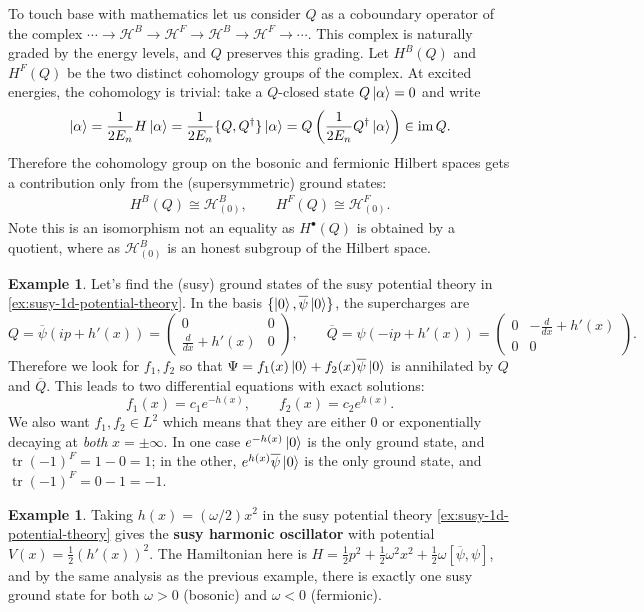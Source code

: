 \documentclass{report}
\theoremstyle{plain}
\theoremstyle{definition}
\newtheorem{example}[theorem]{Example}
\theoremstyle{remark}
\DeclareMathOperator{\im}{im}
\DeclareMathOperator{\tr}{tr}
\newcommand{\mc}{\mathcal}
\newcommand{\cnj}{\overline}
\newcommand{\FR}[2]{\frac{#1}{#2}}
\begin{document}
To touch base with mathematics let us consider $Q$ as a coboundary
operator of the complex $\cdots \to \mc H^B\to \mc H^F \to \mc H^B \to
\mc H^F \to \cdots$. This complex is naturally graded by the energy
levels, and $Q$ preserves this grading. Let $H^B(Q)$ and $H^F(Q)$ be
the two distinct cohomology groups of the complex. At excited
energies, the cohomology is trivial: take a $Q$-closed state
$Q\ket{\alpha}=0$ and write
\[ \ket\alpha = \FR{1}{2E_n}H \ket\alpha = \FR{1}{2E_n}\{Q,Q^\dagger\}\ket\alpha = Q \left( \FR{1}{2E_n} Q^\dagger\ket\alpha \right) \in \im Q. \]
Therefore the cohomology group on the bosonic and fermionic Hilbert
spaces gets a contribution only from the (supersymmetric) ground
states:
\begin{align} H^B(Q) \cong \mc H^B_{(0)},\qquad H^F(Q) \cong \mc H^F_{(0)}.
\label{groundStateCohom}
\end{align}
Note this is an isomorphism not an equality as $H^\bullet(Q)$ is obtained
by a quotient, where as $\mc H^B_{(0)}$ is an honest subgroup of the
Hilbert space.

\begin{example} \label{ex:susy-1d-potential-theory-ground-states}
  Let's find the (susy) ground states of the susy potential theory in
  \ref{ex:susy-1d-potential-theory}. In the basis $\{\ket 0,
  \cnj\psi\ket0\}$, the supercharges are
  \[ Q=\cnj\psi(ip+h'(x))=\begin{pmatrix}0&0\\\FR{d}{dx}+h'(x)&0\end{pmatrix},\qquad \cnj Q=\psi(-ip+h'(x))=\begin{pmatrix}0&-\FR{d}{dx}+h'(x)\\0&0\end{pmatrix}.\]
  Therefore we look for $f_1,f_2$ so that $\Psi= f_1(x) \ket0 + f_2(x)
  \cnj\psi\ket0$ is annihilated by $Q$ and $\cnj Q$. This leads to two
  differential equations with exact
  solutions:
  \[f_1(x)=c_1e^{-h(x)},\qquad f_2(x)=c_2 e^{h(x)}.\]
  We also want $f_1,f_2 \in L^2$ which means that they are either $0$
  or exponentially decaying at \emph{both} $x=\pm\infty$. In one case
  $e^{-h(x)}\ket{0}$ is the only ground state, and $\tr (-1)^F = 1 - 0
  = 1$; in the other, $e^{h(x)}\cnj\psi\ket{0}$ is the only ground
  state, and $\tr (-1)^F = 0 - 1 = -1$.
\end{example}

\begin{example} \label{ex:susy-harmonic-oscillator}
  Taking $h(x) = (\omega/2)x^2$ in the susy potential theory
  \ref{ex:susy-1d-potential-theory} gives the {\bf susy harmonic
    oscillator} with potential $V(x) = \frac{1}{2}(h'(x))^2$. The
  Hamiltonian here is $H = \frac{1}{2}p^2 + \frac{1}{2}\omega^2 x^2 +
  \frac{1}{2}\omega [\cnj\psi, \psi]$, and by the same analysis as the
  previous example, there is exactly one susy ground state for both
  $\omega > 0$ (bosonic) and $\omega < 0$ (fermionic).
\end{example}
\end{document}

